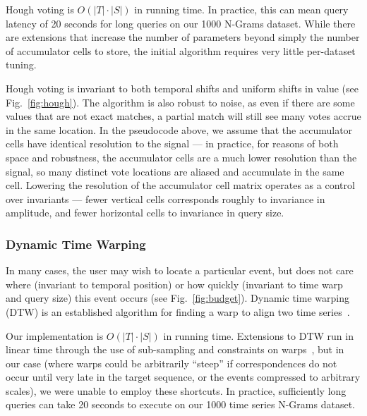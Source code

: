Hough voting is $O(|T|\cdot|S|)$ in running time.  In practice, this can mean query latency of 20 seconds for long queries on our 1000 N-Grams dataset. While there are extensions that increase the number of parameters beyond simply the number of accumulator cells to store, the initial algorithm requires very little per-dataset tuning.

Hough voting is invariant to both temporal shifts and uniform shifts in value (see Fig.~\ref{fig:hough}). The algorithm is also robust to noise, as even if there are some values that are not exact matches, a partial match will still see many votes accrue in the same location. In the pseudocode above, we assume that the accumulator cells have identical resolution to the signal --- in practice, for reasons of both space and robustness, the accumulator cells are a much lower resolution than the signal, so many distinct vote locations are aliased and accumulate in the same cell. Lowering the resolution of the accumulator cell matrix operates as a control over invariants --- fewer vertical cells corresponds roughly to invariance in amplitude, and fewer horizontal cells to invariance in query size.


\subsubsection{Dynamic Time Warping}
\label{sec:dtw}

\budgetFig

In many cases, the user may wish to locate a particular event, but does not care where (invariant to temporal position) or how quickly (invariant to time warp and query size) this event occurs (see Fig.~\ref{fig:budget}). Dynamic time warping (DTW) is an established algorithm for finding a warp to align two time series~\cite{berndt1994using}.

Our implementation is $O(|T|\cdot|S|)$ in running time.
Extensions to DTW run in linear time through the use of sub-sampling and constraints on warps~\cite{salvador2004fastdtw}, but in our case (where warps could be arbitrarily ``steep'' if correspondences do not occur until very late in the target sequence, or the events compressed to arbitrary scales), we were unable to employ these shortcuts. In practice, sufficiently long queries can take 20 seconds to execute on our 1000 time series N-Grams dataset.

